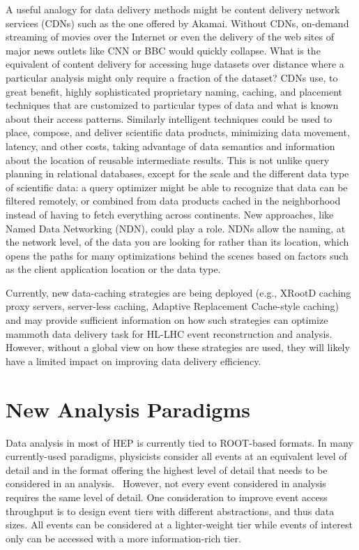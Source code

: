 \documentclass[12pt,a4paper]{article}
\begin{document}
A useful analogy for data delivery methods might be content delivery
network services (CDNs) such as the one offered by Akamai. Without CDNs,
%
%
on-demand streaming of movies over the Internet or even the delivery of
the web sites of major news outlets like CNN or BBC would quickly
collapse. What is the equivalent of content delivery for accessing huge
datasets over distance where a particular analysis might only
require a fraction of the dataset? CDNs use, to great benefit, highly
sophisticated proprietary naming, caching, and placement techniques
that are customized to particular types of data and what is known about
their access patterns. Similarly intelligent techniques could be used to
place, compose, and deliver scientific data products, minimizing data
movement, latency, and other costs, taking advantage of data semantics
and information about the location of reusable intermediate results.
This is not unlike query planning in relational databases, except for
the scale and the different data type of scientific data: a query
optimizer might be able to recognize that data can be filtered remotely,
or combined from data products cached in the neighborhood instead of
having to fetch everything across continents. New approaches, like Named
Data Networking (NDN), could play a role. NDNs allow the naming, at the
network level, of the data you are looking for rather than its location, which
opens the paths for many optimizations behind the scenes based on
factors such as the client application location or the data type.

Currently, new data-caching strategies are being deployed (e.g., XRootD
caching proxy servers, server-less caching, Adaptive Replacement Cache-style caching) and may
%
%
provide sufficient information on how such strategies can optimize
mammoth data delivery task for HL-LHC event reconstruction and analysis.
However, without a global view on how these strategies are used, they
will likely have a limited impact on improving data delivery efficiency.

\section{New Analysis Paradigms}\label{new-analysis-paradigms}

Data analysis in most of HEP is currently tied to ROOT-based formats. In many
currently-used paradigms, physicists consider all events at an
equivalent level of detail and in the format offering the highest level
of detail that needs to be considered in an analysis. ~However, not
every event considered in analysis requires the same level of detail.
One consideration to improve event access throughput is to design event
tiers with different abstractions, and thus data sizes. All events can
be considered at a lighter-weight tier while events of interest only can
be accessed with a more information-rich tier.
\end{document}
